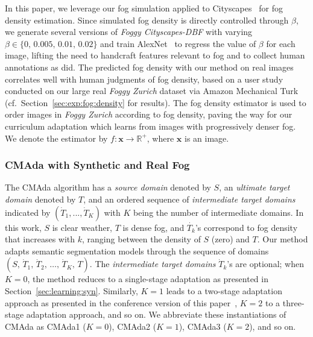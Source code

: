 \documentclass[twocolumn]{svjour3}          \smartqed  \usepackage{graphicx}
\begin{document}
In this paper, we leverage our fog simulation applied to Cityscapes~\cite{Cityscapes} for fog density estimation. Since simulated fog density is directly controlled through $\beta$, we generate several versions of \emph{Foggy Cityscapes-DBF} with varying $\beta \in \{0,\,0.005,\,0.01,\,0.02\}$ and train AlexNet~\cite{alexnet} to regress the value of $\beta$ for each image, lifting the need to handcraft features relevant to fog and to collect human annotations as \cite{fog:density:15} did. The predicted fog density with our method on real images correlates well with human judgments of fog density, based on a user study conducted on our large real \emph{Foggy Zurich} dataset via Amazon Mechanical Turk (cf.\ Section~\ref{sec:exp:fog:density} for results). The fog density estimator is used to order images in \emph{Foggy Zurich} according to fog density, paving the way for our curriculum adaptation which learns from images with progressively denser fog. We denote the estimator by $f: \mathbf{x} \rightarrow \mathbb{R}^+$, where $\mathbf{x}$ is an image. 


\subsubsection{CMAda with Synthetic and Real Fog}
\label{sec:CMAda}

The CMAda algorithm has a \emph{source domain} denoted by $S$, an \emph{ultimate target domain} denoted by $T$, and an ordered sequence of \emph{intermediate target domains} indicated by $(\dot{T}_1, ..., \dot{T}_K)$ with $K$ being the number of intermediate domains. In this work, $S$ is clear weather, $T$ is dense fog, and $\dot{T_k}$'s correspond to fog density that increases with $k$, ranging between the density of $S$ (zero) and $T$. Our method adapts semantic segmentation models through the sequence of domains $(S,\,\dot{T}_1,\,\dot{T}_2,\,\dots,\,\dot{T}_K,\,T)$.
The \emph{intermediate target domains} $\dot{T}_k$'s are optional; when $K=0$, the method reduces to a single-stage adaptation as presented in Section~\ref{sec:learning:syn}. Similarly, $K=1$ leads to a two-stage adaptation approach as presented in the conference version of this paper~\cite{dense:SFSU:eccv18}, $K=2$ to a three-stage adaptation approach, and so on. We abbreviate these instantiations of CMAda as CMAda1 ($K=0$), CMAda2 ($K=1$), CMAda3 ($K=2$), and so on.  
\end{document}
